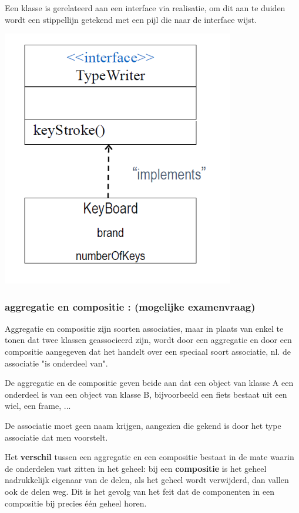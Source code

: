 Een klasse is gerelateerd aan een interface via realisatie, om dit aan te duiden wordt een stippellijn getekend met een pijl die naar de interface wijst.


\begin{center}
\includegraphics[width=4in]{img/int2}%
\end{center}

\newpage
\subsubsection{aggregatie en compositie : (mogelijke examenvraag)}

Aggregatie en compositie zijn soorten associaties, maar in plaats van enkel te tonen dat twee klassen geassocieerd zijn, wordt door een aggregatie en door een compositie aangegeven dat het handelt over een speciaal soort associatie, nl. de associatie "is onderdeel van".

De aggregatie en de compositie geven beide aan dat een object van klasse A een onderdeel is van een object van klasse B, bijvoorbeeld een fiets bestaat uit een wiel, een frame, ...

De associatie moet geen naam krijgen, aangezien die gekend is door het type associatie dat men voorstelt.

Het \textbf{verschil} tussen een aggregatie en een compositie bestaat in de mate waarin de onderdelen vast zitten in het geheel: bij een \textbf{compositie} is het geheel nadrukkelijk eigenaar van de delen, als het geheel wordt verwijderd, dan vallen ook de delen weg. Dit is het gevolg van het feit dat de componenten in een compositie bij precies één geheel horen.

